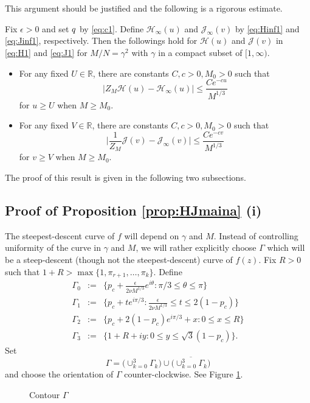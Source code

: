 \documentclass[11pt]{article}
\begin{document}
This argument should be justified and the following is a rigorous
estimate.

\begin{prop}\label{prop:HJmaina}
Fix $\epsilon>0$ and set $q$ by \eqref{eq:c1}. Define
$\mathcal{H}_\infty(u)$ and $\mathcal{J}_\infty(v)$ by
\eqref{eq:Hinf1} and \eqref{eq:Jinf1}, respectively. Then the
followings hold for $\mathcal{H}(u)$ and $\mathcal{J}(v)$ in
\eqref{eq:H1} and \eqref{eq:J1} for $M/N=\gamma^2$ with $\gamma$
in a compact subset of $[1,\infty)$.
\begin{itemize}
\item[(i)] For any fixed $U\in\mathbb{R}$,
there are constants $C, c>0, M_0>0$ such that
\begin{equation}\label{eq:estprop1}
  \bigl| Z_M \mathcal{H}(u) - \mathcal{H}_\infty(u) \bigr|
  \le \frac{Ce^{-cu}}{M^{1/3}}
\end{equation}
for $u\ge U$ when $M\ge M_0$.
\item[(ii)] For any fixed $V\in \mathbb{R}$,
there are constants $C,c>0, M_0>0$ such that
\begin{equation}\label{eq:estprop3}
  \bigl| \frac1{Z_M}\mathcal{J}(v)
- \mathcal{J}_\infty(v) \bigr|
  \le \frac{Ce^{-cv}}{M^{1/3}}
\end{equation}
for $v\ge V$ when $M\ge M_0$.
\end{itemize}
\end{prop}


The proof of this result is given in the following two subsections.


\bigskip

\subsection{Proof of Proposition \ref{prop:HJmaina} (i)}

The steepest-descent curve of $f$ will depend on $\gamma$ and $M$.
Instead of controlling uniformity of the curve in $\gamma$ and
$M$, we will rather explicitly choose $\Gamma$ which will be a
steep-descent (though not the steepest-descent) curve of $f(z)$.
Fix $R>0$ such that $1+R>\max\{1,\pi_{r+1},\dots, \pi_k\}$. Define
\begin{eqnarray}
  \Gamma_0 &:=& \{ p_c+ \frac{\epsilon}{2\nu M^{1/3}}e^{i\theta} :
\pi/3\le \theta\le
  \pi\} \\
  \Gamma_1 &:=& \{ p_c+ te^{i\pi/3} :
\frac{\epsilon}{2\nu M^{1/3}} \le t \le 2(1-p_c) \} \\
  \Gamma_2 &:=& \{ p_c+2(1-p_c)e^{i\pi/3} + x : 0\le x\le R\} \\
  \Gamma_3 &:=& \{ 1+R+iy : 0\le y\le \sqrt{3}(1-p_c) \}.
\end{eqnarray}
Set
\begin{equation}
  \Gamma = \bigl( \cup_{k=0}^3 \Gamma_k \bigr) \cup \overline{\bigl( \cup_{k=0}^3 \Gamma_k \bigr)}
\end{equation}
and choose the orientation of $\Gamma$ counter-clockwise. See
Figure \ref{fig:Steep1}.
\begin{figure}[ht]
\centerline{\epsfxsize=11cm} \caption{Contour
$\Gamma$}\label{fig:Steep1}
\end{figure}
\end{document}
